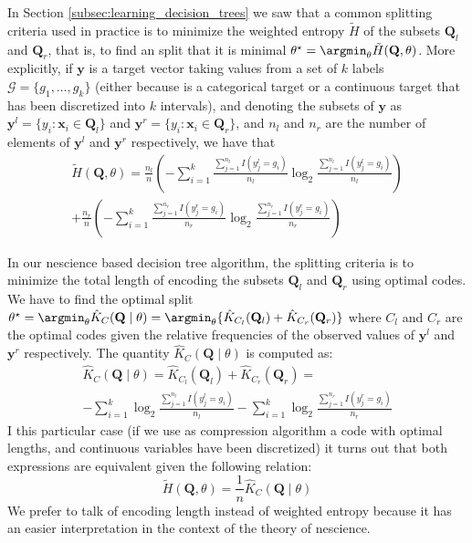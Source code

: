 In Section \ref{subsec:learning_decision_trees} we saw that a common splitting criteria used in practice is to minimize the weighted entropy $\tilde{H}$ of the subsets $\mathbf{Q}_l$ and $\mathbf{Q}_r$, that is, to find an split that it is minimal $\theta^\star = \argmin_\theta \tilde{H}(\mathbf{Q},\theta)$. More explicitly, if $\mathbf{y}$ is a target vector taking values from a set of $k$ labels $\mathcal{G} = \{g_1, \ldots, g_k \}$ (either because is a categorical target or a continuous target that has been discretized into $k$ intervals), and denoting the subsets of $\mathbf{y}$ as $\mathbf{y}^l = \{y_i : \mathbf{x}_i \in \mathbf{Q}_l \}$ and $\mathbf{y}^r = \{y_i : \mathbf{x}_i \in \mathbf{Q}_r \}$, and $n_l$ and $n_r$ are the number of elements of $\mathbf{y}^l$ and $\mathbf{y}^r$ respectively, we have that
\begin{multline}
\tilde{H}(\mathbf{Q},\theta) = \frac{n_l}{n} \left( - \sum_{i=1}^k \frac{ \sum_{j=1}^{n_l} I(y^l_j = g_i)} {n_l} \log_2{ \frac{ \sum_{j=1}^{n_l} I(y^l_j = g_i)} {n_l} } \right) \\
+ \frac{n_r}{n} \left( - \sum_{i=1}^k \frac{ \sum_{j=1}^{n_r} I(y^r_j = g_i)} {n_r} \log_2{ \frac{ \sum_{j=1}^{n_r} I(y^r_j = g_i)} {n_r} } \right)
\end{multline}

In our nescience based decision tree algorithm, the splitting criteria is to minimize the total length of encoding the subsets $\mathbf{Q}_l$ and $\mathbf{Q}_r$ using optimal codes. We have to find the optimal split $ \theta^\star = \argmin_\theta \hat{K}_C(\mathbf{Q} \mid \theta) = \argmin_\theta \{ \hat{K}_{C_l}(\mathbf{Q}_l) + \hat{K}_{C_r}(\mathbf{Q}_r) \}$ where $C_l$ and $C_r$ are the optimal codes given the relative frequencies of the observed values of $\mathbf{y}^l$ and $\mathbf{y}^r$ respectively. The quantity $\hat{K}_C(\mathbf{Q} \mid \theta)$ is computed as:
\begin{multline}
\hat{K}_C(\mathbf{Q} \mid \theta) = \hat{K}_{C_l}(\mathbf{Q}_l) + \hat{K}_{C_r}(\mathbf{Q}_r) = \\
- \sum_{i=1}^k \log_2{ \frac{ \sum_{j=1}^{n_l} I(y^l_j = g_i)} {n_l} } - \sum_{i=1}^k \log_2{ \frac{ \sum_{j=1}^{n_r} I(y^r_j = g_i)} {n_r} }
\end{multline}
I this particular case (if we use as compression algorithm a code with optimal lengths, and continuous variables have been discretized) it turns out that both expressions are equivalent given the following relation:
\[
\tilde{H}(\mathbf{Q},\theta) = \frac{1}{n} \hat{K}_C(\mathbf{Q} \mid \theta)
\]
We prefer to talk of encoding length instead of weighted entropy because it has an easier interpretation in the context of the theory of nescience.

